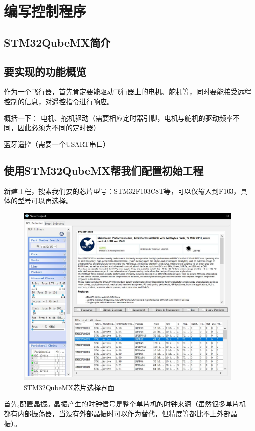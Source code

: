 \documentclass{article}
\begin{document}
\section{编写控制程序}
\subsection{STM32QubeMX简介}
\subsection{要实现的功能概览}
作为一个飞行器，首先肯定要能驱动飞行器上的电机、舵机等，同时要能接受远程控制的信息，对遥控指令进行响应。

概括一下：
电机、舵机驱动（需要相应定时器引脚，电机与舵机的驱动频率不同，因此必须为不同的定时器）

蓝牙遥控（需要一个USART串口）

\subsection{使用STM32QubeMX帮我们配置初始工程}
新建工程，搜索我们要的芯片型号：STM32F103C8T等，可以仅输入到F103，具体的型号可以再选择。
\begin{figure}[ht]
	\centering
	\includegraphics[scale=0.3]{Qube界面.jpg}
	\caption{STM32QubeMX芯片选择界面}
	\label{fig:label}
\end{figure}

首先,配置晶振。晶振产生的时钟信号是整个单片机的时钟来源（虽然很多单片机都有内部振荡器，当没有外部晶振时可以作为替代，但精度等都比不上外部晶振）。
\end{document}
